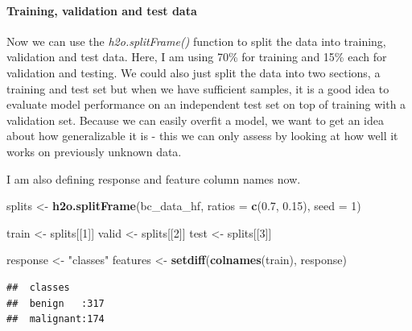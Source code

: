 \documentclass[]{article}
\newenvironment{Shaded}{\begin{snugshade}}{\end{snugshade}}
\newcommand{\KeywordTok}[1]{\textcolor[rgb]{0.13,0.29,0.53}{\textbf{{#1}}}}
\newcommand{\DataTypeTok}[1]{\textcolor[rgb]{0.13,0.29,0.53}{{#1}}}
\newcommand{\DecValTok}[1]{\textcolor[rgb]{0.00,0.00,0.81}{{#1}}}
\newcommand{\FloatTok}[1]{\textcolor[rgb]{0.00,0.00,0.81}{{#1}}}
\newcommand{\StringTok}[1]{\textcolor[rgb]{0.31,0.60,0.02}{{#1}}}
\newcommand{\OtherTok}[1]{\textcolor[rgb]{0.56,0.35,0.01}{{#1}}}
\newcommand{\NormalTok}[1]{{#1}}
\let\oldparagraph\paragraph
\renewcommand{\paragraph}[1]{\oldparagraph{#1}\mbox{}}
\begin{document}
\paragraph{Training, validation and test
data}\label{training-validation-and-test-data-1}

Now we can use the \emph{h2o.splitFrame()} function to split the data
into training, validation and test data. Here, I am using 70\% for
training and 15\% each for validation and testing. We could also just
split the data into two sections, a training and test set but when we
have sufficient samples, it is a good idea to evaluate model performance
on an independent test set on top of training with a validation set.
Because we can easily overfit a model, we want to get an idea about how
generalizable it is - this we can only assess by looking at how well it
works on previously unknown data.

I am also defining response and feature column names now.

\begin{Shaded}
\begin{Highlighting}[]
\NormalTok{splits <-}\StringTok{ }\KeywordTok{h2o.splitFrame}\NormalTok{(bc_data_hf, }
                         \DataTypeTok{ratios =} \KeywordTok{c}\NormalTok{(}\FloatTok{0.7}\NormalTok{, }\FloatTok{0.15}\NormalTok{), }
                         \DataTypeTok{seed =} \DecValTok{1}\NormalTok{)}

\NormalTok{train <-}\StringTok{ }\NormalTok{splits[[}\DecValTok{1}\NormalTok{]]}
\NormalTok{valid <-}\StringTok{ }\NormalTok{splits[[}\DecValTok{2}\NormalTok{]]}
\NormalTok{test <-}\StringTok{ }\NormalTok{splits[[}\DecValTok{3}\NormalTok{]]}

\NormalTok{response <-}\StringTok{ "classes"}
\NormalTok{features <-}\StringTok{ }\KeywordTok{setdiff}\NormalTok{(}\KeywordTok{colnames}\NormalTok{(train), response)}
\end{Highlighting}
\end{Shaded}

\begin{Shaded}
\end{Shaded}

\begin{verbatim}
##  classes       
##  benign   :317 
##  malignant:174
\end{verbatim}
\end{document}

